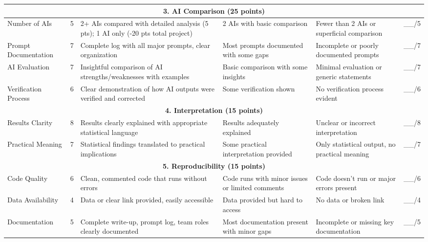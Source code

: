 \documentclass[11pt]{article}
\begin{document}
\begin{longtable}{|p{3cm}|p{1.2cm}|p{3.5cm}|p{3.5cm}|p{3.5cm}|p{1.2cm}|}
\multicolumn{6}{|c|}{\textbf{3. AI Comparison (25 points)}} \\
\hline

Number of AIs & 5 &
2+ AIs compared with detailed analysis (5 pts); 1 AI only (-20 pts total project) &
2 AIs with basic comparison &
Fewer than 2 AIs or superficial comparison &
\_\_/5 \\
\hline

Prompt Documentation & 7 &
Complete log with all major prompts, clear organization &
Most prompts documented with some gaps &
Incomplete or poorly documented prompts &
\_\_/7 \\
\hline

AI Evaluation & 7 &
Insightful comparison of AI strengths/weaknesses with examples &
Basic comparison with some insights &
Minimal evaluation or generic statements &
\_\_/7 \\
\hline

Verification Process & 6 &
Clear demonstration of how AI outputs were verified and corrected &
Some verification shown &
No verification process evident &
\_\_/6 \\
\hline

\multicolumn{6}{|c|}{\textbf{4. Interpretation (15 points)}} \\
\hline

Results Clarity & 8 &
Results clearly explained with appropriate statistical language &
Results adequately explained &
Unclear or incorrect interpretation &
\_\_/8 \\
\hline

Practical Meaning & 7 &
Statistical findings translated to practical implications &
Some practical interpretation provided &
Only statistical output, no practical meaning &
\_\_/7 \\
\hline

\multicolumn{6}{|c|}{\textbf{5. Reproducibility (15 points)}} \\
\hline

Code Quality & 6 &
Clean, commented code that runs without errors &
Code runs with minor issues or limited comments &
Code doesn't run or major errors present &
\_\_/6 \\
\hline

Data Availability & 4 &
Data or clear link provided, easily accessible &
Data provided but hard to access &
No data or broken link &
\_\_/4 \\
\hline

Documentation & 5 &
Complete write-up, prompt log, team roles clearly documented &
Most documentation present with minor gaps &
Incomplete or missing key documentation &
\_\_/5 \\
\hline


\end{longtable}
\end{document}
